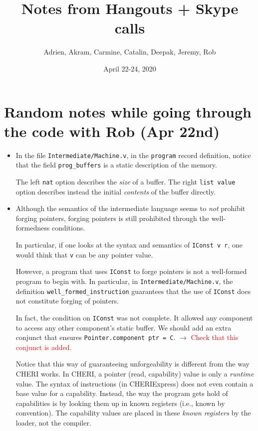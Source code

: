\documentclass[12pt,a4paper]{article}
\title{Notes from Hangouts + Skype calls}
\author{Adrien, Akram, Carmine, Catalin, Deepak, Jeremy, Rob}
\date{April 22-24, 2020}
\newcommand{\todo}[1]{$\rightarrow$ \textcolor{red}{#1}}
\begin{document}
\maketitle
\tableofcontents

\section{Random notes while going through 
	the code with Rob (Apr 22nd)}

\begin{itemize}
\item In the file \texttt{Intermediate/Machine.v}, in the
 \texttt{program} record definition, notice that the field 
 \texttt{prog\_buffers} is a static description of the memory.
 
The left \texttt{nat} option describes the \textit{size} of a buffer.
The right \texttt{list value} option describes instead the
initial \textit{contents}
of the buffer directly.

\item Although the 
semantics of the intermediate language seems to \textit{not} prohibit
forging pointers, forging pointers is still prohibited through
the well-formedness conditions.

In particular, if one looks at the syntax and semantics of
\texttt{IConst v r}, one would think that \texttt{v} can be any
pointer value.

However, a program that uses \texttt{IConst} to forge
pointers is not
a well-formed program to begin with. In particular, in 
\texttt{Intermediate/Machine.v}, the definition
\texttt{well\_formed\_instruction} guarantees that 
the use of \texttt{IConst} does not constitute forging of pointers.

In fact, the condition on \texttt{IConst} was not complete. It allowed
any component to access any other component's static buffer.
We should add an extra conjunct that ensures 
\texttt{Pointer.component ptr = C}. 
\todo{Check that this conjunct is added.}

Notice that this way of guaranteeing unforgeability is different
from the way CHERI works.
In CHERI, a pointer (read, capability) value is only a 
\textit{runtime} value. The syntax of instructions (in CHERIExpress)
does not even contain a base value for a capability.
Instead, the way the program gets hold of capabilities is by looking them
up in known registers (i.e., known by convention).
The capability values are placed in these \textit{known registers}
by the loader, not the compiler.


\end{itemize}
\end{document}
